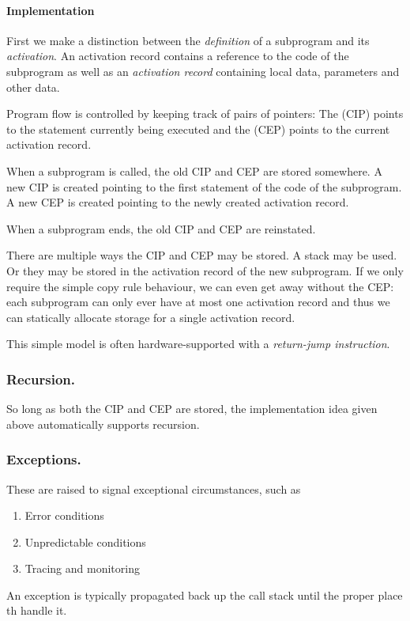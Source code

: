 \paragraph{Implementation}
First we make a distinction between the \textit{definition} of a subprogram and its \textit{activation}. An activation record contains a reference to the code of the subprogram as well as an \textit{activation record} containing local data, parameters and other data.

Program flow is controlled by keeping track of pairs of pointers: The  (CIP) points to the statement currently being executed and the  (CEP) points to the current activation record.

When a subprogram is called, the old CIP and CEP are stored somewhere. A new CIP is created pointing to the first statement of the code of the subprogram. A new CEP is created pointing to the newly created activation record.

When a subprogram ends, the old CIP and CEP are reinstated.

There are multiple ways the CIP and CEP may be stored. A stack may be used. Or they may be stored in the activation record of the new subprogram. If we only require the simple copy rule behaviour, we can even get away without the CEP: each subprogram can only ever have at most one activation record and thus we can statically allocate storage for a single activation record.

This simple model is often hardware-supported with a \textit{return-jump instruction}.

\subsubsection{Recursion.}
So long as both the CIP and CEP are stored, the implementation idea given above automatically supports recursion.

\subsubsection{Exceptions.} These are raised to signal exceptional circumstances, such as 
\begin{enumerate}
\item Error conditions
\item Unpredictable conditions
\item Tracing and monitoring
\end{enumerate}
An exception is typically propagated back up the call stack until the proper place th handle it.

